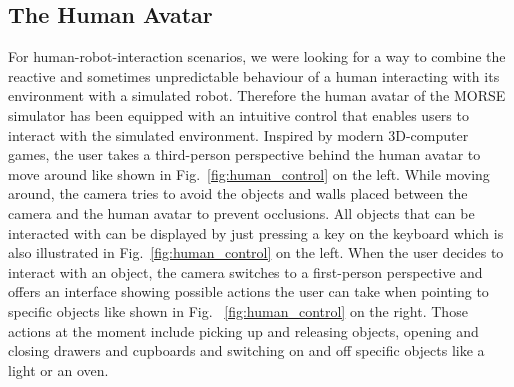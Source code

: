 \documentclass{llncs}
\begin{document}


\subsection{The Human Avatar}
\label{section:human}

For human-robot-interaction scenarios, we were looking for a way to combine the
reactive and sometimes unpredictable behaviour of a human interacting with its
environment with a simulated robot. Therefore the human avatar of the MORSE
simulator has been equipped with an intuitive 
control that enables users to interact with the simulated environment. Inspired
by modern 3D-computer games, the user takes a third-person perspective behind
the human avatar to move around like shown in Fig.~\ref{fig:human_control} on
the left. 
While moving around, the camera tries to avoid the objects and walls placed
between the camera and the human avatar to prevent occlusions.  All objects
that can be interacted with can be displayed by just pressing a key on the
keyboard which is also illustrated in Fig.~\ref{fig:human_control} on the
left. When the user decides to interact with an object, the camera switches to
a first-person perspective and offers an interface showing possible actions the
user can take when pointing to specific objects like shown in Fig.~
\ref{fig:human_control} on the right. Those actions at the moment include
picking up and releasing objects, opening and closing drawers and cupboards and
switching on and off specific objects like a light or an oven. 
\end{document}
